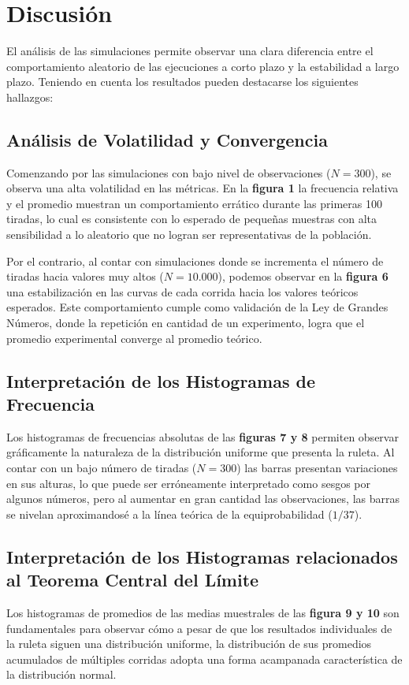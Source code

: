 \documentclass{article}
\begin{document}
\section{Discusión}

El análisis de las simulaciones permite observar una clara diferencia entre el comportamiento aleatorio de las ejecuciones a corto plazo y la estabilidad a largo plazo. Teniendo en cuenta los resultados pueden destacarse los siguientes hallazgos:

\subsection{Análisis de Volatilidad y Convergencia}
Comenzando por las simulaciones con bajo nivel de observaciones ($N=300$), se observa una alta volatilidad en las métricas. En la \textbf{figura 1} la frecuencia relativa y el promedio muestran un comportamiento errático durante las primeras 100 tiradas, lo cual es consistente con lo esperado de pequeñas muestras con alta sensibilidad a lo aleatorio que no logran ser representativas de la población.

Por el contrario, al contar con simulaciones donde se incrementa el número de tiradas hacia valores muy altos ($N=10.000$), podemos observar en la \textbf{figura 6} una estabilización en las curvas de cada corrida hacia los valores teóricos esperados. Este comportamiento cumple como validación de la Ley de Grandes Números, donde la repetición en cantidad de un experimento, logra que el promedio experimental converge al promedio teórico.

\subsection{Interpretación de los Histogramas de Frecuencia}
Los histogramas de frecuencias absolutas de las \textbf{figuras 7 y 8} permiten observar gráficamente la naturaleza de la distribución uniforme que presenta la ruleta.
Al contar con un bajo número de tiradas ($N=300$) las barras presentan variaciones en sus alturas, lo que puede ser erróneamente interpretado como sesgos por algunos números, pero al aumentar en gran cantidad las observaciones, las barras se nivelan aproximandosé a la línea teórica de la equiprobabilidad ($1/37$).

\subsection{Interpretación de los Histogramas relacionados al Teorema Central del Límite}
Los histogramas de promedios de las medias muestrales de las \textbf{figura 9 y 10} son fundamentales para observar cómo a pesar de que los resultados individuales de la ruleta siguen una distribución uniforme, la distribución de sus promedios acumulados de múltiples corridas adopta una forma acampanada característica de la distribución normal.
\end{document}
